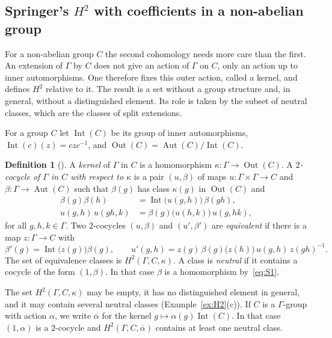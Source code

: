 \documentclass[12pt,letterpaper]{article}
\numberwithin{equation}{section}
\theoremstyle{plain}
\theoremstyle{definition}
\newtheorem{definition}[theorem]{Definition}
\DeclareMathOperator{\Aut}{Aut}
\DeclareMathOperator{\Int}{Int}
\DeclareMathOperator{\Out}{Out}
\begin{document}
\subsection{Springer's \texorpdfstring{$H^2$}{H2} with coefficients in a non-abelian group}

For a non-abelian group $C$ the second cohomology needs more care than
the first. An extension of $\Gamma$ by $C$ does not give an action of
$\Gamma$ on $C$, only an action up to inner automorphisms. One therefore
fixes this outer action, called a kernel, and defines $H^2$ relative to
it. The result is a set without a group structure and, in general,
without a distinguished element. Its role is taken by the subset of
neutral classes, which are the classes of split extensions.

For a group $C$ let $\Int(C)$ be its group of inner automorphisms,
$\Int(c)(z)=czc^{-1}$, and $\Out(C)=\Aut(C)/\Int(C)$.

\begin{definition}[{\cite[1.13--1.17]{Sp66}}]\label{def:H2}
A \emph{kernel} of $\Gamma$ in $C$ is a homomorphism
$\kappa:\Gamma\to\Out(C)$. A \emph{$2$-cocycle of $\Gamma$ in $C$ with
respect to $\kappa$} is a pair $(u,\beta)$ of maps
$u:\Gamma\times\Gamma\to C$ and $\beta:\Gamma\to\Aut(C)$ such that
$\beta(g)$ has class $\kappa(g)$ in $\Out(C)$ and
\begin{align}
\beta(g)\beta(h)&=\Int\bigl(u(g,h)\bigr)\,\beta(gh), \label{eq:S1}\\
u(g,h)\,u(gh,k)&=\beta(g)\bigl(u(h,k)\bigr)\,u(g,hk), \label{eq:S2}
\end{align}
for all $g,h,k\in\Gamma$. Two $2$-cocycles $(u,\beta)$ and $(u',\beta')$
are \emph{equivalent} if there is a map $z:\Gamma\to C$ with
\begin{equation}\label{eq:S3}
\beta'(g)=\Int\bigl(z(g)\bigr)\beta(g),\qquad
u'(g,h)=z(g)\,\beta(g)\bigl(z(h)\bigr)\,u(g,h)\,z(gh)^{-1}.
\end{equation}
The set of equivalence classes is $H^2(\Gamma,C,\kappa)$. A class is
\emph{neutral} if it contains a cocycle of the form $(1,\beta)$. In that case
$\beta$ is a homomorphism by~\eqref{eq:S1}.
\end{definition}

The set $H^2(\Gamma,C,\kappa)$ may be empty, it has no distinguished
element in general, and it may contain several neutral classes
(Example~\ref{ex:H2}(c)). If $C$ is a $\Gamma$-group with action $\alpha$,
we write $\overline{\alpha}$ for the kernel $g\mapsto\alpha(g)\Int(C)$. In
that case $(1,\alpha)$ is a $2$-cocycle and
$H^2(\Gamma,C,\overline{\alpha})$ contains at least one neutral class.
\end{document}
